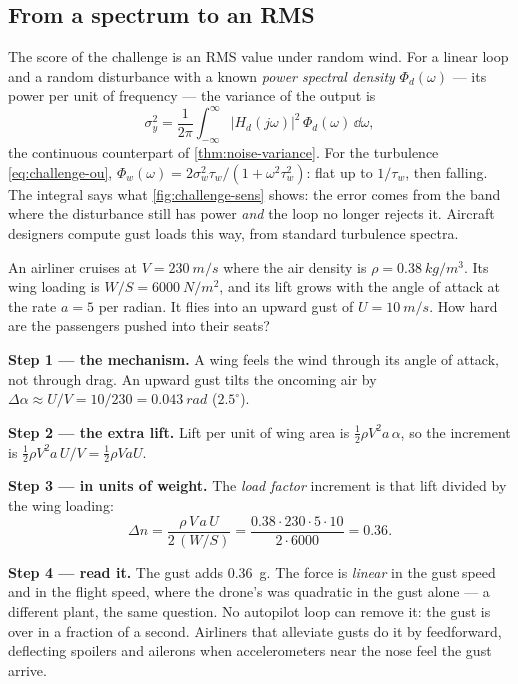 \subsection{From a spectrum to an RMS}
The score of the challenge is an RMS value under random wind. For a linear loop and a random disturbance with a known \emph{power spectral density} $\Phi_d(\omega)$ — its power per unit of frequency — the variance of the output is
\begin{equation}\label{eq:challenge-rms}
  \sigma_y^2 = \frac{1}{2\pi}\int_{-\infty}^{\infty} |H_d(j\omega)|^2\,\Phi_d(\omega)\,\dd\omega ,
\end{equation}
the continuous counterpart of \cref{thm:noise-variance}. For the turbulence \eqref{eq:challenge-ou}, $\Phi_w(\omega) = 2\sigma_w^2\tau_w/(1 + \omega^2\tau_w^2)$: flat up to $1/\tau_w$, then falling. The integral says what \cref{fig:challenge-sens} shows: the error comes from the band where the disturbance still has power \emph{and} the loop no longer rejects it. Aircraft designers compute gust loads this way, from standard turbulence spectra.

\begin{example}
\label{ex:challenge-aircraft}
An airliner cruises at $V = \SI{230}{m/s}$ where the air density is $\rho = \SI{0.38}{kg/m^3}$. Its wing loading is $W/S = \SI{6000}{N/m^2}$, and its lift grows with the angle of attack at the rate $a = 5$ per radian. It flies into an upward gust of $U = \SI{10}{m/s}$. How hard are the passengers pushed into their seats?

\textbf{Step 1 — the mechanism.} A wing feels the wind through its angle of attack, not through drag. An upward gust tilts the oncoming air by $\Delta\alpha \approx U/V = 10/230 = \SI{0.043}{rad}$ ($2.5^\circ$).

\textbf{Step 2 — the extra lift.} Lift per unit of wing area is $\tfrac12\rho V^2 a\,\alpha$, so the increment is $\tfrac12\rho V^2 a\,U/V = \tfrac12\rho V a U$.

\textbf{Step 3 — in units of weight.} The \emph{load factor} increment is that lift divided by the wing loading:
\begin{equation*}
  \Delta n = \frac{\rho\,V\,a\,U}{2\,(W/S)} = \frac{0.38 \cdot 230 \cdot 5 \cdot 10}{2 \cdot 6000} = 0.36 .
\end{equation*}

\textbf{Step 4 — read it.} The gust adds \SI{0.36}{g}. The force is \emph{linear} in the gust speed and in the flight speed, where the drone's was quadratic in the gust alone — a different plant, the same question. No autopilot loop can remove it: the gust is over in a fraction of a second. Airliners that alleviate gusts do it by feedforward, deflecting spoilers and ailerons when accelerometers near the nose feel the gust arrive.
\end{example}

